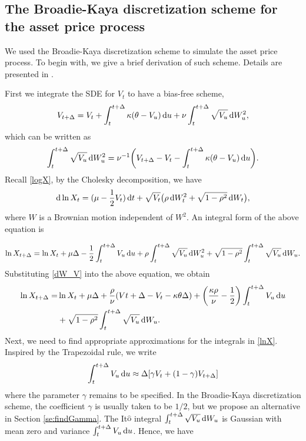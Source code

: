 \documentclass{ws-ijfe}
\begin{document}
\subsection{The Broadie-Kaya discretization scheme for the asset price process}

We used the Broadie-Kaya discretization scheme to simulate the asset price process. To begin with, we give a brief derivation of such scheme. Details are presented in \cite{Andersen2006}.

First we integrate the SDE for $V_t$ to have a bias-free scheme,
\begin{equation*}
  V_{t+\Delta} = V_t+\int_{t}^{t+\Delta}\kappa(\theta-V_u)\,\mathrm{d} u +\nu\int_{t}^{t+\Delta}\sqrt{V_u}\,\mathrm{d} W_u^2,
\end{equation*}
which can be written as
\begin{equation}\label{dW_V}
\int_{t}^{t+\Delta}\sqrt{V_u}\,\d W_u^2=\nu^{-1}\bigg(V_{t+\Delta}- V_t-\int_{t}^{t+\Delta}\kappa(\theta-V_u)\,\d u\bigg).
\end{equation}
Recall \eqref{logX}, by the Cholesky decomposition, we have
\begin{equation*}
 \mathrm{d} \ln X_t=(\mu-\frac{1}{2}V_t)\,\mathrm{d} t +\sqrt{V_t}\big(\rho\,\mathrm{d} W_t^2+\sqrt{1-\rho^2}\,\mathrm{d} W_t\big),
\end{equation*}
where $W$ is a Brownian motion independent of $W^2$. An integral form of the above equation is

\begin{equation*}
\begin{split}
  \ln X_{t+\Delta}=\ln X_t +\mu\Delta-\frac{1}{2}\int_{t}^{t+\Delta}V_u\,\mathrm{d} u +\rho\int_{t}^{t+\Delta}\sqrt{V_u}\,\mathrm{d} W_u^2+\sqrt{1-\rho^2}\int_{t}^{t+\Delta}\sqrt{V_u}\,\mathrm{d} W_u.
\end{split}
\end{equation*}
Substituting \eqref{dW_V} into the above equation, we obtain
\begin{equation}\label{lnX}
\begin{split}
   \ln X_{t+\Delta}=&\ln X_t+\mu\Delta+\frac{\rho}{\nu}(V{t+\Delta}-V_t-\kappa\theta\Delta)+\bigg(\frac{\kappa\rho}{\nu}-\frac{1}{2}\bigg)\int_{t}^{t+\Delta}V_u\,\d u\\&
   +\sqrt{1-\rho^2}\int_{t}^{t+\Delta}\sqrt{V_u}\,\d W_u.
\end{split}
\end{equation}
Next, we need to find appropriate approximations for the integrals in \eqref{lnX}. Inspired by the Trapezoidal rule, we write
\begin{equation}\label{approx_du}
  \int_{t}^{t+\Delta}V_u\,\d u \approx \Delta[\gamma V_t+(1-\gamma) V_{t+\Delta}]
\end{equation}
where the parameter $\gamma$ remains to be specified. In the Broadie-Kaya discretization scheme, the coefficient $\gamma$ is usually taken to be $1/2$, but we propose an alternative in Section \ref{se:findGamma}.
The It$\hat{\text{o}}$ integral
$
  \int_{t}^{t+\Delta}\sqrt{V_u}\,\mathrm{d} W_u
$
is Gaussian with mean zero and variance $\int_{t}^{t+\Delta}V_u\,\mathrm{d} u$. Hence, we have
\end{document}
